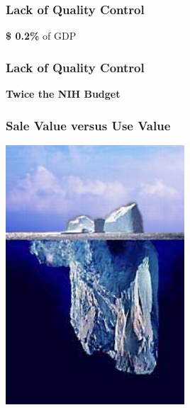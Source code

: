\documentclass[18pt]{beamer}
\begin{document}
{
\begin{frame}
\frametitle{Lack of Quality Control}
\Huge
\begin{center}
\textbf{\$ 0.2\%} of GDP
\end{center}
\end{frame}
}


{
\begin{frame}
\frametitle{Lack of Quality Control}
\Huge
\begin{center}
\textbf{Twice the NIH Budget}
\end{center}
\end{frame}
}



\begin{frame}[plain]
\frametitle{Sale Value versus Use Value}
  \includegraphics[width=0.5\textwidth,height=\paperheight]{../Art/Iceberg.jpg}
\end{frame}


{
\begin{frame}[plain]
\end{frame}
}
\end{document}
